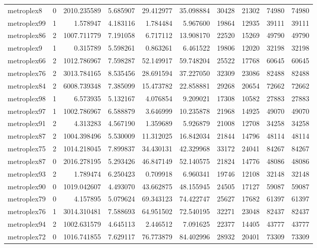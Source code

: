 \begin{longtable}{|l|r|r|r|r|r|r|r|r|r|}
metroplex8 & 0 & 2010.235589 & 5.685907 & 29.412977 & 35.098884 & 30428 & 21302 & 74980 & 74980 \\
metroplex99 & 1 & 1.578947 & 4.183116 & 1.784484 & 5.967600 & 19864 & 12935 & 39111 & 39111 \\
metroplex86 & 2 & 1007.711779 & 7.191058 & 6.717112 & 13.908170 & 22520 & 15269 & 49790 & 49790 \\
metroplex9 & 1 & 0.315789 & 5.598261 & 0.863261 & 6.461522 & 19806 & 12020 & 32198 & 32198 \\
metroplex66 & 2 & 1012.786967 & 7.598287 & 52.149917 & 59.748204 & 25522 & 17768 & 60645 & 60645 \\
metroplex76 & 2 & 3013.784165 & 8.535456 & 28.691594 & 37.227050 & 32309 & 23086 & 82488 & 82488 \\
metroplex84 & 2 & 6008.739348 & 7.385099 & 15.473782 & 22.858881 & 29268 & 20654 & 72662 & 72662 \\
metroplex98 & 1 & 6.573935 & 5.132167 & 4.076854 & 9.209021 & 17308 & 10582 & 27883 & 27883 \\
metroplex97 & 1 & 1002.786967 & 6.588879 & 3.646999 & 10.235878 & 21968 & 14925 & 49070 & 49070 \\
metroplex91 & 2 & 4.313283 & 4.567190 & 1.359689 & 5.926879 & 21008 & 12708 & 34258 & 34258 \\
metroplex87 & 2 & 1004.398496 & 5.530009 & 11.312025 & 16.842034 & 21844 & 14796 & 48114 & 48114 \\
metroplex75 & 2 & 1014.218045 & 7.899837 & 34.430131 & 42.329968 & 33172 & 24041 & 84267 & 84267 \\
metroplex87 & 0 & 2016.278195 & 5.293426 & 46.847149 & 52.140575 & 21824 & 14776 & 48086 & 48086 \\
metroplex93 & 2 & 1.789474 & 6.250423 & 0.709918 & 6.960341 & 19746 & 12108 & 32148 & 32148 \\
metroplex90 & 0 & 1019.042607 & 4.493070 & 43.662875 & 48.155945 & 24505 & 17127 & 59087 & 59087 \\
metroplex79 & 0 & 4.157895 & 5.079624 & 69.343123 & 74.422747 & 25627 & 17682 & 61397 & 61397 \\
metroplex76 & 1 & 3014.310481 & 7.588693 & 64.951502 & 72.540195 & 32271 & 23048 & 82437 & 82437 \\
metroplex94 & 2 & 1002.631579 & 4.645113 & 2.446512 & 7.091625 & 22377 & 14405 & 43777 & 43777 \\
metroplex72 & 0 & 1016.741855 & 7.629117 & 76.773879 & 84.402996 & 28932 & 20401 & 73309 & 73309 \\

\end{longtable}
